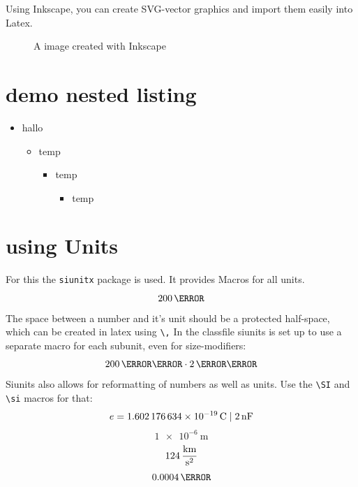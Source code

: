 \documentclass[	%
		11pt,a4paper,	%
		twoside,		%
		english,		%
		f1				%
	]{HsH-report}		%
\begin{document}
	Using Inkscape, you can create SVG-vector graphics and import them easily into Latex.
	\begin{figure}
		\def\svgwidth{0.3\textwidth} %
		\graphicspath{{svg/}} %
		\caption{A image created with Inkscape}
		\label{subfig: svg}
	\end{figure}

	\pagebreak
\section{demo nested listing}
	\begin{itemize}
		\item hallo
		\begin{itemize}
			\item temp
			\begin{itemize}
				\item temp
				\begin{itemize}
					\item temp
				\end{itemize}
			\end{itemize}
		\end{itemize}
	\end{itemize}


\section{using Units}
	For this the \lstinline{siunitx} package is used. It provides Macros for all units.
	\begin{equation}
		200\,\kg
	\end{equation}
	The space between a number and it's unit should be a protected half-space, which can be created in latex using \lstinline{\,} In the classfile
	siunits is set up to use a separate macro for each subunit, even for size-modifiers:
	\begin{equation}
		200\,\milli\metre \cdot 2\,\mega\volt
	\end{equation}
	Siunits also allows for reformatting of numbers as well as units. Use the \lstinline{\SI} and \lstinline{\si} macros for that:
	\begin{equation}
		e = \SI{1.602176634E-19}{\coulomb} %
		\;|\; \SI[exponent-to-prefix]{2e-9}{\farad} %
	\end{equation}
	\begin{equation}
		\SI[exponent-to-prefix]{1e-6}{\metre}
	\end{equation}
	\begin{equation}
		124\,\si[per-mode=fraction]{\kilo\metre\per\second\squared} %
	\end{equation}
	\begin{equation}
		\num{0.0004}\,\lumen %
	\end{equation}
\end{document}
